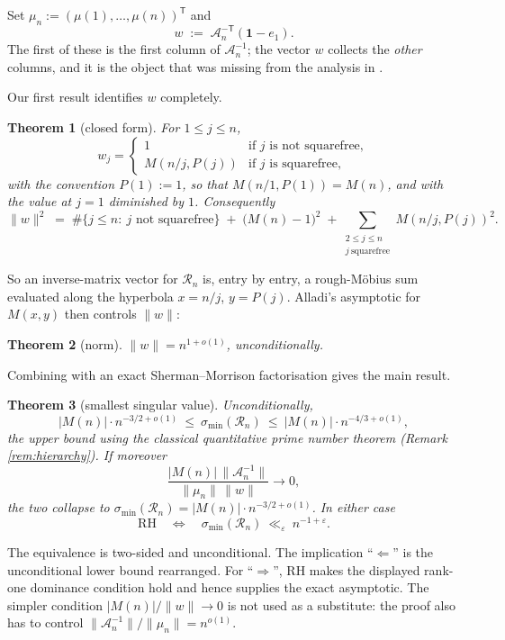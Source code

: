\documentclass[11pt]{article}
\newtheorem{theorem}{Theorem}
\theoremstyle{definition}
\theoremstyle{remark}
\newcommand{\Rc}{\mathcal{R}}
\newcommand{\Ac}{\mathcal{A}}
\newcommand{\Pp}{P}
\begin{document}
Set $\mu_n := (\mu(1),\dots,\mu(n))^{\mathsf T}$ and
\begin{equation}\label{eq:defw}
  w \;:=\; \Ac_n^{-\mathsf T}(\mathbf 1 - e_1).
\end{equation}
The first of these is the first column of $\Ac_n^{-1}$; the vector $w$ collects the
\emph{other} columns, and it is the object that was missing from the analysis in
\cite{kline588}.

Our first result identifies $w$ completely.

\begin{theorem}[closed form]\label{thm:closed}
For $1\le j\le n$,
\[
  w_j =
  \begin{cases}
    1 & \text{if $j$ is not squarefree},\\
    M(n/j,\Pp(j)) & \text{if $j$ is squarefree},
  \end{cases}
\]
with the convention $\Pp(1):=1$, so that $M(n/1,\Pp(1))=M(n)$, and with the value
at $j=1$ diminished by $1$. Consequently
\[
  \|w\|^2 \;=\; \#\{j\le n:\ j\text{ not squarefree}\}
  \;+\;\bigl(M(n)-1\bigr)^2
  \;+\!\!\sum_{\substack{2\le j\le n\\ j\ \mathrm{squarefree}}}\!\! M(n/j,\Pp(j))^2 .
\]
\end{theorem}

So an inverse-matrix vector for $\Rc_n$ is, entry by entry, a rough-M\"obius sum
evaluated along the hyperbola $x=n/j$, $y=\Pp(j)$. Alladi's asymptotic for $M(x,y)$
then controls $\|w\|$:

\begin{theorem}[norm]\label{thm:norm}
$\|w\| = n^{1+o(1)}$, unconditionally.
\end{theorem}

Combining with an exact Sherman--Morrison factorisation gives the main result.

\begin{theorem}[smallest singular value]\label{thm:main}
Unconditionally,
\[
  |M(n)|\cdot n^{-3/2+o(1)}\ \le\ \sigma_{\min}(\Rc_n)\ \le\
  |M(n)|\cdot n^{-4/3+o(1)},
\]
the upper bound using the classical quantitative prime number theorem (Remark
\ref{rem:hierarchy}). If moreover
\[
 \frac{|M(n)|\,\|\Ac_n^{-1}\|}{\|\mu_n\|\,\|w\|}\longrightarrow0,
\]
the two collapse to
$\sigma_{\min}(\Rc_n)=|M(n)|\cdot n^{-3/2+o(1)}$. In either case
\[
  \text{RH}\quad\Longleftrightarrow\quad
  \sigma_{\min}(\Rc_n)\ \ll_\varepsilon\ n^{-1+\varepsilon}.
\]
\end{theorem}

The equivalence is two-sided and unconditional. The implication
``$\Longleftarrow$'' is the unconditional lower bound rearranged. For
``$\Longrightarrow$'', RH makes the displayed rank-one dominance condition hold
and hence supplies the exact asymptotic. The simpler condition
$|M(n)|/\|w\|\to0$ is not used as a substitute: the proof also has to control
$\|\Ac_n^{-1}\|/\|\mu_n\|=n^{o(1)}$.
\end{document}
